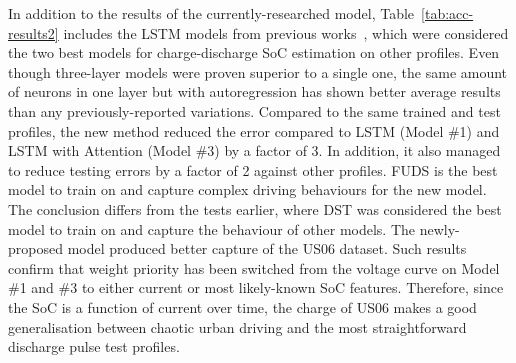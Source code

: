%
%
{In addition to the results of the currently-researched model, Table~\ref{tab:acc-results2} includes the LSTM models from previous works~\cite{sadykov_practical_2022}, which were considered the two best models for charge-discharge SoC estimation on other profiles.
Even though three-layer models were proven superior to a single one, the same amount of neurons in one layer but with autoregression has shown better average results than any previously-reported variations.}
Compared to the same trained and test profiles, the new method reduced the error compared to LSTM (Model \#1) and LSTM with Attention (Model \#3) by a factor of 3.
In addition, it also managed to reduce testing errors by a factor of 2 against other profiles.
FUDS is the best model to train on and capture complex driving behaviours for the new model.
The conclusion differs from the tests earlier, where DST was considered the best model to train on and capture the behaviour of other models.
The newly-proposed model produced better capture of the US06 dataset.
Such results confirm that weight priority has been switched from the voltage curve on Model \#1 and \#3 to either current or most likely-known SoC features.
Therefore, since the SoC is a function of current over time, the charge of US06 makes a good generalisation between chaotic urban driving and the most straightforward discharge pulse test profiles.

